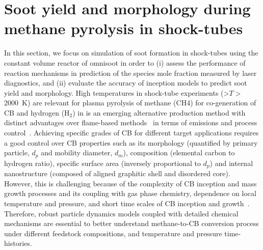 \section{Soot yield and morphology during methane pyrolysis in shock-tubes}

In this section, we focus on simulation of soot formation in shock-tubes using the constant volume reactor of omnisoot in order to (i) assess the performance of reaction mechanisms in prediction of the species mole fraction measured by laser diagnostics, and (ii) evaluate the accuracy of inception models to predict soot yield and morphology. High temperatures in shock-tube experiments (>$T>$2000~K) are relevant for plasma pyrolysis of methane (CH4) for co-generation of CB and hydrogen ($\mathrm{H_2}$) in is an emerging alternative production method with distinct advantages over flame-based methods~\citep{fulcheri2023energy} in terms of emissions and process control~\citep{cho2004conversion}. Achieving specific grades of CB for different target applications requires a good control over CB properties such as its morphology (quantified by primary particle, $d_p$ and mobility diameter, $d_m$), composition (elemental carbon to hydrogen ratio), specific surface area (inversely proportional to $d_p$) and internal nanostructure (composed of aligned graphitic shell and disordered core). However, this is challenging because of the complexity of CB inception and mass growth processes and its coupling with gas phase chemistry, dependence on local temperature and pressure, and short time scales of CB inception and growth~\citep{violi2005relative}. Therefore, robust particle dynamics models coupled with detailed chemical mechanisms are essential to better understand methane-to-CB conversion process under different feedstock compositions, and temperature and pressure time-histories.

